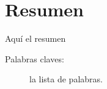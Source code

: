 \section*{Resumen}
Aquí el resumen

\begin{description}
	\item[Palabras claves:]{la lista de palabras.}
\end{description}


